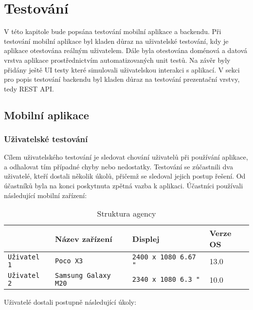 \chapter{Testování}

\begin{chapterabstract}
V této kapitole bude popsána testování mobilní aplikace a backendu. Při testování mobilní aplikace byl kladen důraz na uživatelské testování, kdy je aplikace otestována reálným uživatelem. Dále byla otestována doménová a datová vrstva aplikace prostřednictvím automatizovaných unit testů. Na závěr byly přidány ještě UI testy které simulovali uživatelskou interakci s aplikací. V sekci pro popis testování backendu byl kladen důraz na testování prezentační vrstvy, tedy REST API.
\end{chapterabstract}


\section{Mobilní aplikace}

\subsection{Uživatelské testování}
Cílem uživatelského testování je sledovat chování uživatelů při používání aplikace, a odhalovat tím případné chyby nebo nedostatky. Testování se zúčastnili dva uživatelé, kteří dostali několik úkolů, přičemž se sledoval jejich postup řešení. Od účastníků byla na konci poskytnuta zpětná vazba k aplikaci. Účastníci používali následující mobilní zařízení:

\begin{table}[!h]\centering
	\caption[Použitá testovací zařízení]{Struktura agency}
	\begin{tabular}{|l|l|l|p{4cm}|}\hline
		& Název zařízení	& Displej	& Verze OS \tabularnewline \hline \hline
		\texttt{Uživatel 1} & \texttt{Poco X3}		& \texttt{2400 x 1080 6.67 "}	& 13.0		\tabularnewline \hline
		
		\texttt{Uživatel 2} & \texttt{Samsung Galaxy M20}		& \texttt{2340 x 1080 6.3 "}	& 10.0		\tabularnewline \hline
	\end{tabular}
\end{table}

\noindent Uživatelé dostali postupně následující úkoly:

